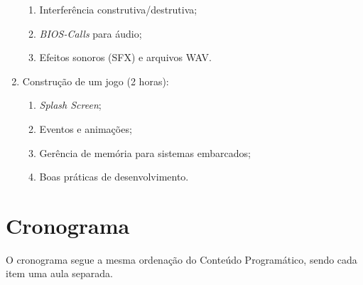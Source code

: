 \documentclass{article}
\begin{document}
\begin{enumerate}
\begin{enumerate}
                \item Interferência construtiva/destrutiva;
                \item \textit{BIOS-Calls} para áudio;
                \item Efeitos sonoros (SFX) e arquivos WAV.
        \end{enumerate}
    \item Construção de um jogo (2 horas):
        \begin{enumerate}
                \item \textit{Splash Screen};
                \item Eventos e animações;
                \item Gerência de memória para sistemas embarcados;
                \item Boas práticas de desenvolvimento.
        \end{enumerate}
\end{enumerate}

\section{Cronograma}

O cronograma segue a mesma ordenação do Conteúdo Programático, sendo cada item
uma aula separada.

\nocite{*}


\end{document}
